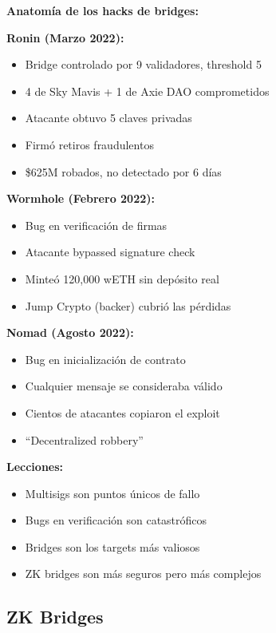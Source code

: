 \documentclass[11pt,a4paper,twoside,openright]{book}
\theoremstyle{definition}
\theoremstyle{plain}
\theoremstyle{remark}
\begin{document}
\begin{advertencia}
\textbf{Anatomía de los hacks de bridges:}

\textbf{Ronin (Marzo 2022):}
\begin{itemize}
    \item Bridge controlado por 9 validadores, threshold 5
    \item 4 de Sky Mavis + 1 de Axie DAO comprometidos
    \item Atacante obtuvo 5 claves privadas
    \item Firmó retiros fraudulentos
    \item \$625M robados, no detectado por 6 días
\end{itemize}

\textbf{Wormhole (Febrero 2022):}
\begin{itemize}
    \item Bug en verificación de firmas
    \item Atacante bypassed signature check
    \item Minteó 120,000 wETH sin depósito real
    \item Jump Crypto (backer) cubrió las pérdidas
\end{itemize}

\textbf{Nomad (Agosto 2022):}
\begin{itemize}
    \item Bug en inicialización de contrato
    \item Cualquier mensaje se consideraba válido
    \item Cientos de atacantes copiaron el exploit
    \item ``Decentralized robbery''
\end{itemize}

\textbf{Lecciones:}
\begin{itemize}
    \item Multisigs son puntos únicos de fallo
    \item Bugs en verificación son catastróficos
    \item Bridges son los targets más valiosos
    \item ZK bridges son más seguros pero más complejos
\end{itemize}
\end{advertencia}

\subsection{ZK Bridges}
\end{document}
